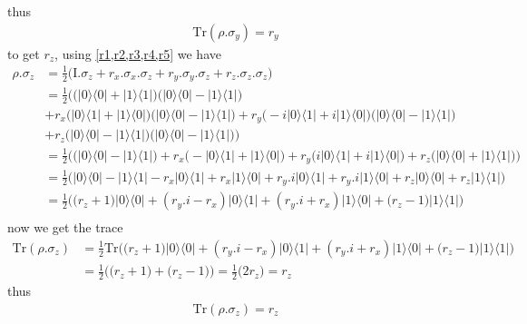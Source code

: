 \documentclass{article}
\newcommand{\op}[2]{|#1\rangle \langle#2|}
\begin{document}
thus
\begin{align*}
    \boxed{\text{Tr}(\rho.\sigma_{y}) = r_y}
\end{align*}
to get $r_z$, using \cref{r1,r2,r3,r4,r5} we have
\begin{align*}
    \rho.\sigma_{z} &= \frac{1}{2}\big(\text{I}.\sigma_{z} + r_x.\sigma_x.\sigma_z + r_y.\sigma_y.\sigma_z + r_z.\sigma_z.\sigma_z \big) \\
    &= \frac{1}{2}\bigg(\big(\op{0}{0} + \op{1}{1}\big)\big(\op{0}{0} - \op{1}{1}\big) \\
    &+ r_x\big(\op{0}{1} + \op{1}{0}\big)\big(\op{0}{0} - \op{1}{1}\big) + r_y\big(-i\op{0}{1} + i\op{1}{0}\big)\big(\op{0}{0} - \op{1}{1}\big) \\
    &+ r_z\big(\op{0}{0} - \op{1}{1}\big)\big(\op{0}{0} - \op{1}{1}\big)\bigg) \\
    &= \frac{1}{2}\bigg(\big(\op{0}{0} - \op{1}{1}\big) + r_x\big(-\op{0}{1} + \op{1}{0}\big) + r_y\big(i\op{0}{1} + i\op{1}{0}\big) + r_z\big(\op{0}{0} + \op{1}{1}\big)\bigg) \\
    &= \frac{1}{2}\bigg(\op{0}{0} - \op{1}{1} - r_x\op{0}{1} + r_x\op{1}{0}+ r_y.i\op{0}{1} + r_y.i\op{1}{0} + r_z\op{0}{0} + r_z\op{1}{1}\bigg) \\
    &= \frac{1}{2}\bigg(\big( r_z + 1 \big)\op{0}{0} + (r_y.i - r_x)\op{0}{1} + (r_y.i + r_x)\op{1}{0} + \big( r_z - 1 \big)\op{1}{1}\bigg) \\
\end{align*}
now we get the trace
\begin{align*}
    \text{Tr}(\rho.\sigma_{z}) &= \frac{1}{2}\text{Tr}\bigg(\big( r_z + 1 \big)\op{0}{0} + (r_y.i - r_x)\op{0}{1} + (r_y.i + r_x)\op{1}{0} + \big( r_z - 1 \big)\op{1}{1}\bigg) \\
    &= \frac{1}{2}\bigg(\big( r_z + 1 \big) + \big( r_z - 1 \big)\bigg) = \frac{1}{2}\big(2r_z\big) = r_z
\end{align*}
thus
\begin{align*}
    \boxed{\text{Tr}(\rho.\sigma_{z}) = r_z}
\end{align*}
\end{document}
